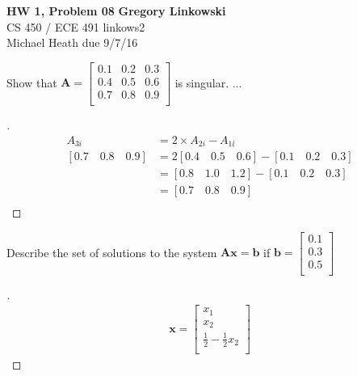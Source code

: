 \documentclass[12pt]{article}
\newenvironment{exercise}[2][Exercise]{\begin{trivlist}
\item[\hskip \labelsep {\bfseries #1}\hskip \labelsep {\bfseries #2.}]}{\end{trivlist}}
\begin{document}
\noindent
\large\textbf{HW 1, Problem 08} \hfill \textbf{Gregory Linkowski} \\
\normalsize CS 450 / ECE 491 \hfill linkows2 \\
Michael Heath \hfill due 9/7/16 \\



\begin{exercise}{1a} 
	Show that $\bm{A} = 
	\begin{bmatrix}
		0.1 & 0.2 & 0.3 \\
		0.4 & 0.5 & 0.6 \\
		0.7 & 0.8 & 0.9 \\
	\end{bmatrix} $ is singular. ...
\end{exercise}

\begin{proof}[]
	\begin{align*}
		A_{3i} &= 2 \times A_{2i} - A_{1i} \\
		[0.7\quad 0.8\quad 0.9] &= 2[0.4\quad 0.5\quad 0.6] - [0.1\quad 0.2\quad 0.3] \\
			&= [0.8\quad 1.0\quad 1.2] - [0.1\quad 0.2\quad 0.3] \\
			&= [0.7\quad 0.8\quad 0.9] \\
	\end{align*}
\end{proof}

\begin{exercise}{1b}
	Describe the set of solutions to the system $\bm{Ax}=\bm{b}$ if $\bm{b} = 
	\begin{bmatrix}
		0.1 \\
		0.3 \\
		0.5 \\
	\end{bmatrix} $
\end{exercise} 

\begin{proof}[]
	\begin{align*}
	\bm{x} =
	\begin{bmatrix}
		x_1 \\
		x_2 \\
		\frac{1}{2} - \frac{1}{2}x_2 \\
	\end{bmatrix}
	\end{align*}
\end{proof}
\end{document}
